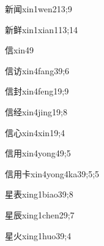 \begin{verbete}{新闻}{xin1wen2}{13;9}
\end{verbete}

\begin{verbete}{新鲜}{xin1xian1}{13;14}
\end{verbete}

\begin{verbete}{信}{xin4}{9}
\end{verbete}

\begin{verbete}{信访}{xin4fang3}{9;6}
\end{verbete}

\begin{verbete}{信封}{xin4feng1}{9;9}
\end{verbete}

\begin{verbete}{信经}{xin4jing1}{9;8}
\end{verbete}

\begin{verbete}{信心}{xin4xin1}{9;4}
\end{verbete}

\begin{verbete}{信用}{xin4yong4}{9;5}
\end{verbete}

\begin{verbete}{信用卡}{xin4yong4ka3}{9;5;5}
\end{verbete}

\begin{verbete}{星表}{xing1biao3}{9;8}
\end{verbete}

\begin{verbete}{星辰}{xing1chen2}{9;7}
\end{verbete}

\begin{verbete}{星火}{xing1huo3}{9;4}
\end{verbete}

